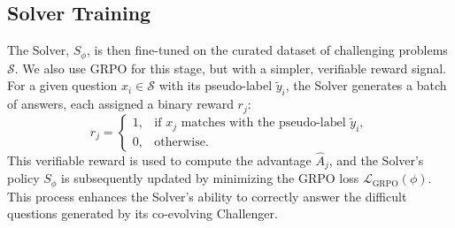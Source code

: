 \subsection{Solver Training}
\label{sec:solver_training}
The Solver, $S_{\phi}$, is then fine-tuned on the curated dataset of challenging problems $\mathcal{S}$. We also use GRPO for this stage, but with a simpler, verifiable reward signal. For a given question $x_i \in \mathcal{S}$ with its pseudo-label $\tilde{y}_i$, the Solver generates a batch of answers, each assigned a binary reward $r_j$:
\[
  r_j =
  \begin{cases}
    1, & \text{if } x_j \text{ matches with the pseudo-label } \tilde{y}_i, \\
    0, & \text{otherwise}.
  \end{cases}
\]
This verifiable reward is used to compute the advantage $\hat{A}_j$, and the Solver's policy $S_{\phi}$ is subsequently updated by minimizing the GRPO loss $\mathcal{L}_{\text{GRPO}}(\phi)$. This process enhances the Solver's ability to correctly answer the difficult questions generated by its co-evolving Challenger.

